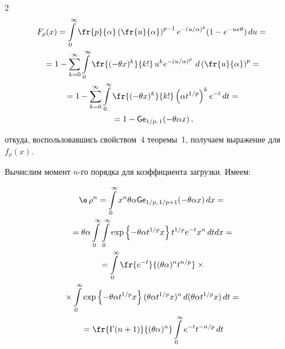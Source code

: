 \begin{multicols}{2}
\begin{multline*}


F_\rho(x) =


\int\limits_0^{\infty}  \fr{p}{\alpha}\left(


\fr{u}{\alpha}\right)^{p-1}e^{-(u/\alpha)^{p}}(1-e^{-ux\theta})\, du={}\\


{}= 1 - \sum\limits_{k=0}^\infty \int\limits_0^{\infty} 


\fr{(-\theta x)^k}{k!}\,u^k e^{-\left(u/\alpha\right)^p} \ d\left(\fr{u}{\alpha}\right)^p ={}\\


{}=


1 - \sum\limits_{k=0}^\infty \int\limits_0^{\infty} 


\fr{(-\theta x)^k}{k!} \left(\alpha t^{1/p}\right)^{k}e^{-t} \, dt ={}\\


{}= 1 - \G_{1/p,\, 1}(-\theta \alpha x)\,,


\end{multline*}


откуда, воспользовавшись свойством~4 теоремы~1, получаем выражение для~$f_\rho(x)$.





Вычислим момент $n$-го порядка для коэффициента загрузки. Имеем:


\begin{multline*}


\e\,\rho^n = \int\limits_0^\infty x^n \theta \alpha \G_{1/p,\, 1/p+1}


(-\theta \alpha x) \, dx = {}\\


{} = \theta \alpha \int\limits_0^\infty \int\limits_0^{\infty} 


\exp \left\lbrace -\theta \alpha t^{1/p}x\right\rbrace t^{1/p}e^{-t} x^{n}\, dt  dx={}\\


{}=\int\limits_0^\infty \fr{e^{-t}}{(\theta \alpha)^n t^{n/p}} \times{}\\


{}\times


\int\limits_0^{\infty} \exp \left\lbrace -\theta \alpha t^{1/p}x\right\rbrace 


(\theta \alpha t^{1/p} x)^n \, d(\theta \alpha t^{1/p} x) \, dt={}\\


{}= \fr{\Gamma(n+1)}{{(\theta \alpha)^n}}\int\limits_0^\infty e^{-t}t^{-n/p}  \, dt 



\end{multline*}
\end{multicols}
